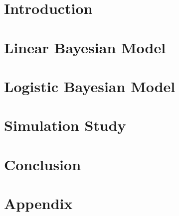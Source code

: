 \documentclass[12pt]{article}
\begin{document}
\newpage
\tableofcontents

\newpage



\section{Introduction}
\label{intro}

\newpage


\section{Linear Bayesian Model}
\label{bayesian_lm}

\newpage

\section{Logistic Bayesian Model}
\label{bayesian_logit}

\newpage

\section{Simulation Study}
\label{simulation}

\newpage

\section{Conclusion}
\label{conclusion}


\newpage



\setcounter{page}{5} %

\appendix

\section{Appendix}
\label{app}

\newpage
\end{document}
